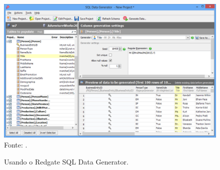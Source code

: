 \documentclass[
	12pt,				%
	openright,			%
	oneside,			%
	a4paper,			%
	english,			%
	brazil				%
	]{abntex2}
\begin{document}
		\begin{figure}[h]
			\centering
			\caption{Usando o Redgate SQL Data Generator.}
			\includegraphics[width=\linewidth]{./figures/TrabalhosRelacionados/sql-data-generator.png}
			\label{fig:RedgateSQLDG}
			\footnotesize Fonte: \cite{RedgateSQLDataGeneratorDoc}.
		\end{figure}
\end{document}
